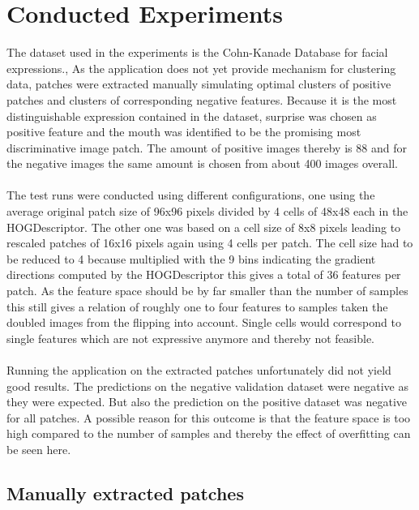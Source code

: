 \section{Conducted Experiments}

The dataset used in the experiments is the Cohn-Kanade Database for facial expressions.\cite{Kanade2000CK+}, \cite{Lucey2010CK+} As the application does not yet provide mechanism for clustering data, patches were extracted manually simulating optimal clusters of positive patches and clusters of corresponding negative features. Because it is the most distinguishable expression contained in the dataset, surprise was chosen as positive feature and the mouth was identified to be the promising most discriminative image patch. The amount of positive images thereby is 88 and for the negative images the same amount is chosen from about 400 images overall.
\\
\\
The test runs were conducted using different configurations, one using the average original patch size of 96x96 pixels divided by 4 cells of 48x48 each in the HOGDescriptor. The other one was based on a cell size of 8x8 pixels leading to rescaled patches of 16x16 pixels again using 4 cells per patch. The cell size had to be reduced to 4 because multiplied with the 9 bins indicating the gradient directions computed by the HOGDescriptor this gives a total of 36 features per patch. As the feature space should be by far smaller than the number of samples this still gives a relation of roughly one to four features to samples taken the doubled images from the flipping into account. Single cells would correspond to single features which are not expressive anymore and thereby not feasible.
\\
\\
Running the application on the extracted patches unfortunately did not yield good results. The predictions on the negative validation dataset were negative as they were expected. But also the prediction on the positive dataset was negative for all patches. A possible reason for this outcome is that the feature space is too high compared to the number of samples and thereby the effect of overfitting can be seen here.

\subsection{Manually extracted patches}

